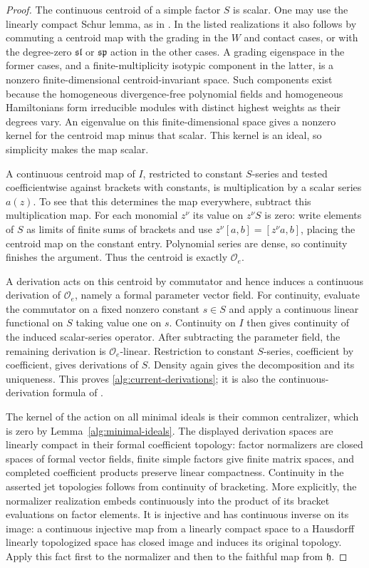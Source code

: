 \begin{proof}
The continuous centroid of a simple factor $S$ is scalar. One may
use the linearly compact Schur lemma, as in
\citet[Lemma~2.2]{FattoriKac2002}. In the listed realizations it also
follows by commuting a centroid map with the grading in the $W$ and
contact cases, or with the degree-zero $\mathfrak{sl}$ or
$\mathfrak{sp}$ action in the other cases. A grading eigenspace in
the former cases, and a finite-multiplicity isotypic component in
the latter, is a nonzero finite-dimensional centroid-invariant
space. Such components exist because the homogeneous
divergence-free polynomial fields and homogeneous Hamiltonians
form irreducible modules with distinct highest weights as their
degrees vary. An eigenvalue on this finite-dimensional space gives
a nonzero kernel for the centroid map minus that scalar. This
kernel is an ideal, so simplicity makes the map scalar.

A continuous centroid map of $I$, restricted to constant $S$-series
and tested coefficientwise against brackets with constants, is
multiplication by a scalar series $a(z)$. To see that this determines
the map everywhere, subtract this multiplication map. For each
monomial $z^\nu$ its value on $z^\nu S$ is zero: write elements of
$S$ as limits of finite sums of brackets and use
$z^\nu[a,b]=[z^\nu a,b]$, placing the centroid map on the constant
entry. Polynomial series are dense, so continuity finishes the
argument. Thus the centroid is exactly $\mathcal O_e$.

A derivation acts on this centroid by commutator and hence induces a
continuous derivation of $\mathcal O_e$, namely a formal parameter
vector field. For continuity, evaluate the commutator on a fixed
nonzero constant $s\in S$ and apply a continuous linear functional
on $S$ taking value one on $s$. Continuity on $I$ then gives
continuity of the induced scalar-series operator. After subtracting
the parameter field, the remaining derivation is
$\mathcal O_e$-linear. Restriction to constant $S$-series, coefficient
by coefficient, gives derivations of $S$. Density again gives the
decomposition and its uniqueness. This proves
\eqref{alg:current-derivations}; it is also the continuous-derivation
formula of \citet[Proposition~6.12(ii)]{BakalovDAndreaKac2001}.

The kernel of the action on all minimal ideals is their common
centralizer, which is zero by Lemma~\ref{alg:minimal-ideals}.
The displayed derivation spaces are linearly compact in their formal
coefficient topology: factor normalizers are closed spaces of formal
vector fields, finite simple factors give finite matrix spaces, and
completed coefficient products preserve linear compactness.
Continuity in the asserted jet topologies follows from continuity of
bracketing. More explicitly, the normalizer realization embeds
continuously into the product of its bracket evaluations on factor
elements. It is injective and has continuous inverse on its image:
a continuous injective map from a linearly compact space to a
Hausdorff linearly topologized space has closed image and induces its
original topology. Apply this fact first to the normalizer and then
to the faithful map from $\mathfrak h$.
\end{proof}

